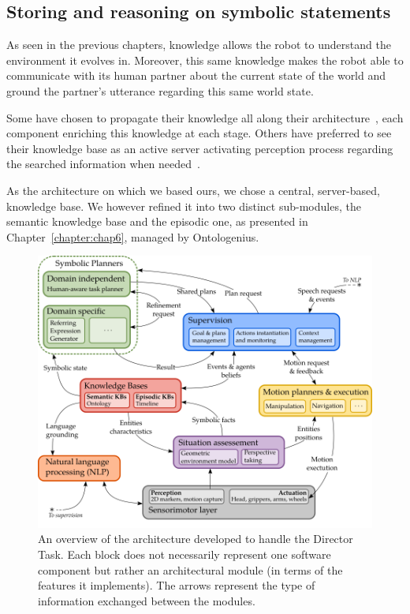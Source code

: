 \documentclass[a4paper,11pt,twoside]{StyleThese}
\begin{document}
\subsection{Storing and reasoning on symbolic statements}

As seen in the previous chapters, knowledge allows the robot to understand the environment it evolves in. Moreover, this same knowledge makes the robot able to communicate with its human partner about the current state of the world and ground the partner's utterance regarding this same world state.

Some have chosen to propagate their knowledge all along their architecture~\citep{hawes_2007_balt}, each component enriching this knowledge at each stage. Others have preferred to see their knowledge base as an active server activating perception process regarding the searched information when needed~\citep{beetz_2018_know}.

As the architecture on which we based ours, we chose a central, server-based, knowledge base. We however refined it into two distinct sub-modules, the semantic knowledge base and the episodic one, as presented in Chapter~\ref{chapter:chap6}, managed by Ontologenius.

\begin{figure}[t!]
	\centering
	\includegraphics[scale=0.40]{figures/chapter4/architecture.png}
	\caption{\label{chap9:fig:architecture} An overview of the architecture developed to handle the Director Task. Each block does not necessarily represent one software component but rather an architectural module (in terms of the features it implements). The arrows represent the type of information exchanged between the modules.}
\end{figure}
\end{document}
